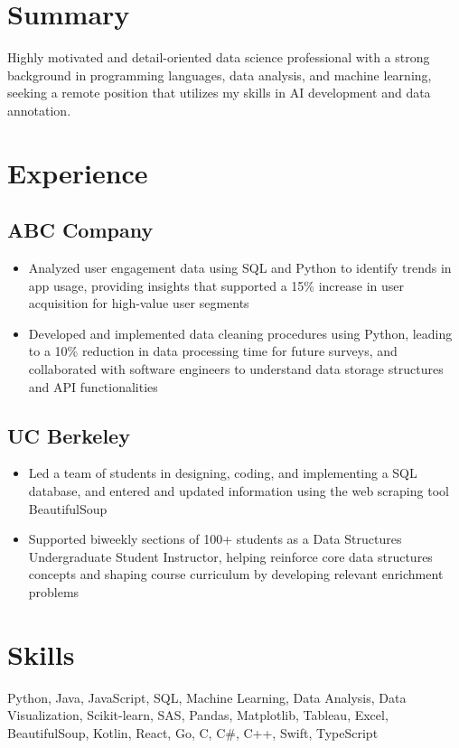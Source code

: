 \documentclass[11pt]{article}
\begin{document}
\section*{Summary}
Highly motivated and detail-oriented data science professional with a strong background in programming languages, data analysis, and machine learning, seeking a remote position that utilizes my skills in AI development and data annotation.

\section*{Experience}
\subsection*{ABC Company}
\begin{itemize}
\item Analyzed user engagement data using SQL and Python to identify trends in app usage, providing insights that supported a 15\% increase in user acquisition for high-value user segments
\item Developed and implemented data cleaning procedures using Python, leading to a 10\% reduction in data processing time for future surveys, and collaborated with software engineers to understand data storage structures and API functionalities
\end{itemize}

\subsection*{UC Berkeley}
\begin{itemize}
\item Led a team of students in designing, coding, and implementing a SQL database, and entered and updated information using the web scraping tool BeautifulSoup
\item Supported biweekly sections of 100+ students as a Data Structures Undergraduate Student Instructor, helping reinforce core data structures concepts and shaping course curriculum by developing relevant enrichment problems
\end{itemize}

\section*{Skills}
Python, Java, JavaScript, SQL, Machine Learning, Data Analysis, Data Visualization, Scikit-learn, SAS, Pandas, Matplotlib, Tableau, Excel, BeautifulSoup, Kotlin, React, Go, C, C\#, C++, Swift, TypeScript
\end{document}
